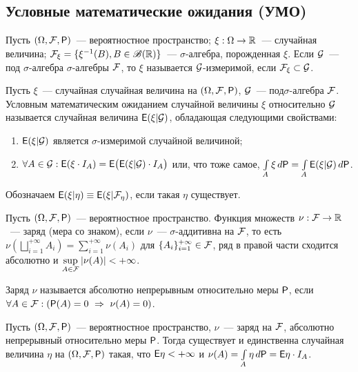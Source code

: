 \subsection*{Условные математические ожидания (УМО)}
Пусть $(\Omega, \F, \P)$~--- вероятностное пространство; $\xi: \Omega \rightarrow \R$~--- случайная величина; $\F_\xi = \{ \xi^{-1}(B), B \in \B(\R) \}$~--- $\sigma$-алгебра, порожденная $\xi$. Если $\G$~--- под $\sigma$-алгебра $\sigma$-алгебры $\F$, то  $\xi$ называется $\G$-измеримой, если $\F_\xi \subset \G$.
\begin{definition}
	Пусть $\xi$~--- случайная случайная величина на $(\Omega, \F, \P)$, $\G$~--- под$\sigma$-алгебра $\F$. Условным математическим ожиданием случайной величины $\xi$ относительно $\G$ называется случайная величина $\E (\xi | \G)$, обладающая следующими свойствами:
	\begin{enumerate}
		\item $\E(\xi | \G )$ является $\sigma$-измеримой случайной величиной;
		\item $\forall A \in \G: \E ( \xi \cdot I_A) = \E \big( \E (\xi | \G )\cdot I_A \big)$ или, что тоже самое, $\int\limits_A \xi \, d \P = \int\limits_A \E (\xi | \G )\,d \P$.
	\end{enumerate}
	Обозначаем $\E (\xi | \eta ) \equiv \E (\xi | \F_\eta )$, если такая $\eta$ существует.
\end{definition}
\begin{definition}
	Пусть $(\Omega, \F, \P)$~--- вероятностное пространство. Функция множеств $\nu: \F \rightarrow \R$~--- заряд (мера со знаком), если $\nu$~--- $\sigma$-аддитивна на $\F$, то есть $\nu \left( \bigsqcup\limits_{i=1}^{+\infty} A_i \right) = \sum\limits_{i=1}^{+\infty} \nu (A_i)$ для $\{ A_i \}_{i=1}^{+\infty} \in \F$, ряд в правой части сходится абсолютно и  $\sup\limits_{A \in \F} | \nu(A) | < + \infty$.
\end{definition}
\begin{definition}
	Заряд $\nu$ называется абсолютно непрерывным относительно меры $\P$, если $\forall A \in \F: (\P (A) = 0~\Rightarrow~\nu (A) = 0)$.
\end{definition}
\begin{theorem}
	Пусть $(\Omega, \F, \P)$~--- вероятностное пространство, $\nu$~--- заряд на $\F$, абсолютно непрерывный относительно меры $\P$. Тогда существует и единственна случайная величина $\eta$ на $(\Omega, \F, \P)$ такая, что $\E \eta < +\infty$ и $\nu(A) = \int\limits_A \eta \, d \P = \E \eta \cdot I_A$.
\end{theorem}